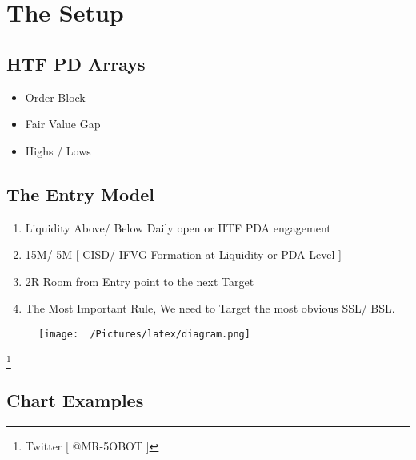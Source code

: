 \documentclass{article}
\begin{document}
\newpage
\section{The Setup}
\vspace{0.3cm}
\subsection{HTF PD Arrays}

\vspace{0.3cm}
\begin{itemize}
      \item Order Block
      \item Fair Value Gap
      \item Highs / Lows
\end{itemize}

\vspace{.1cm}
\subsection{The Entry Model}
\vspace{.3cm}

\begin{enumerate}
    \item Liquidity Above/ Below Daily open or HTF PDA engagement
    \item 15M/ 5M [ CISD/ IFVG Formation at Liquidity or PDA Level ] 
    \item 2R Room from Entry point to the next Target
    \item The Most Important Rule, We need to Target the most obvious SSL/ BSL.
\end{enumerate}

\vspace{1cm}
\begin{figure}[h!]
  \begin{center}
\begin{adjustbox}{width=1.1\textwidth,center}
  \texttt{[image: ~/Pictures/latex/diagram.png]}
\end{adjustbox}
  \end{center}
\end{figure}
\footnote{Twitter [ @MR-5OBOT ]}
\newpage


\centering \subsection{Chart Examples}
\end{document}
